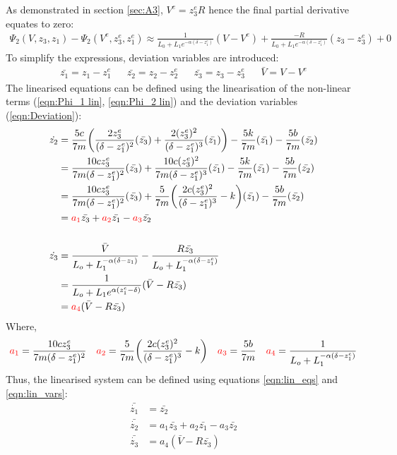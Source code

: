 \documentclass[a4paper,10pt,reqno]{amsart}
\numberwithin{equation}{section}
\begin{document}
As demonstrated in section \ref{sec:A3}, $V^e=z_3^eR$ hence the final partial derivative equates to zero:
\begin{align}\label{eqn:Phi_2 lin}
    \Psi_2(V, z_3, z_1) - \Psi_2(V^e,z_3^e,z_1^e) \approx \frac{1}{L_0+L_1e^{-\alpha(\delta-z_1^e)}}(V-V^e) + \frac{-R}{L_0+L_1e^{-\alpha(\delta-z_1^e)}}(z_3-z_3^e) + 0
\end{align}
To simplify the expressions, deviation variables are introduced: 
\begin{align}\label{eqn:Deviation}
    \bar{z_1} = z_1 - z_1^e && \bar{z_2} = z_2 - z_2^e && \bar{z_3}=z_3-z_3^e && \bar{V}=V-V^e
\end{align}
The linearised equations can be defined using the linearisation of the non-linear terms (\ref{eqn:Phi_1 lin}, \ref{eqn:Phi_2 lin}) and the deviation variables (\ref{eqn:Deviation}):
\begin{subequations}\label{eqn:lin_eqs}
\begin{align}
    \dot{z_2}&=\frac{5c}{7m}\bigg(\frac{2z_3^e}{(\delta-z_1^e)^2}(\bar{z_3})+\frac{2(z_3^e)^2}{(\delta-z_1^e)^3}(\bar{z_1})\bigg)-\frac{5k}{7m}(\bar{z_1})-\frac{5b}{7m}(\bar{z_2})
    \notag\\
    &=\frac{10cz_3^e}{7m(\delta-z_1^e)^2}(\bar{z_3})+\frac{10c(z_3^e)^2}{7m(\delta-z_1^e)^3}(\bar{z_1})-\frac{5k}{7m}(\bar{z_1})-\frac{5b}{7m}(\bar{z_2})
    \notag\\
    &=\frac{10cz_3^e}{7m(\delta-z_1^e)^2}(\bar{z_3})+\frac{5}{7m}\bigg(\frac{2c(z_3^e)^2}{(\delta-z_1^e)^3}-k\bigg)(\bar{z_1})-\frac{5b}{7m}(\bar{z_2})
    \notag
    \\
    &=\color{red}a_1\color{black}\bar{z_3} + \color{red}a_2\color{black}\bar{z_1} - \color{red}a_3\color{black}\bar{z_2}
\\
\notag
\\
    \dot{z_3}&=\frac{\bar{V}}{L_o+L_1^{-\alpha(\delta-z_1)}}-\frac{R\bar{z_3}}{L_o+L_1^{-\alpha(\delta-z_1^e)}}
    \notag\\
    &=\frac{1}{L_o+L_1e^{\alpha(z_1^e-\delta)}}(\bar{V}-R\bar{z_3})
    \notag\\
    &=\color{red}a_4\color{black}(\bar{V}-R\bar{z_3})
\end{align}
\end{subequations}
Where,
\begin{align}\label{eqn:lin_vars}
    \color{red}a_1\color{black}=\frac{10cz_3^e}{7m(\delta-z_1^e)^2} && 
    \color{red}a_2\color{black}=\frac{5}{7m}\bigg(\frac{2c(z_3^e)^2}{(\delta-z_1^e)^3}-k\bigg) &&
    \color{red}a_3\color{black}=\frac{5b}{7m} &&
    \color{red}a_4\color{black}=\frac{1}{L_o+L_1^{-\alpha(\delta-z_1^e)}}
\end{align}
Thus, the linearised system can be defined using equations \ref{eqn:lin_eqs} and \ref{eqn:lin_vars}:
\begin{subequations}
\begin{align}
    \bar{\dot{z_1}} &= \bar{z_2}
    \\
    \bar{\dot{z_2}} &= a_1\bar{z_3} + a_2\bar{z_1} - a_3\bar{z_2}
    \\
    \bar{\dot{z_3}} &= a_4(\bar{V}-R\bar{z_3})
\end{align}
\end{subequations}
\end{document}
